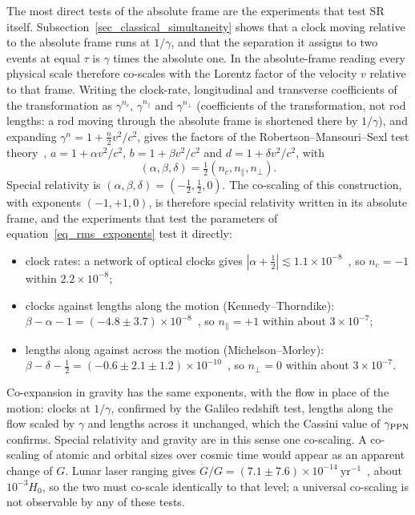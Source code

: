 \documentclass{iopjournal}
\begin{document}
The most direct tests of the absolute frame are the experiments that test SR itself. 
Subsection~\ref{sec_classical_simultaneity} shows that a clock moving relative to the absolute frame runs at $1/\gamma$, and that the separation it assigns to two events at equal $\tau$ is $\gamma$ times the absolute one. In the absolute-frame reading every physical scale therefore co-scales with the Lorentz factor of the velocity $v$ relative to that frame. Writing the clock-rate, longitudinal and transverse coefficients of the transformation as $\gamma^{n_c}$, $\gamma^{n_\parallel}$ and $\gamma^{n_\perp}$ (coefficients of the transformation, not rod lengths: a rod moving through the absolute frame is shortened there by $1/\gamma$), and expanding $\gamma^n=1+\tfrac{n}{2}v^2/c^2$, gives the factors of the Robertson--Mansouri--Sexl test theory~\cite{MansouriSexl1977}, $a=1+\alpha v^2/c^2$, $b=1+\beta v^2/c^2$ and $d=1+\delta v^2/c^2$, with
\begin{equation}\label{eq_rms_exponents}
    \left(\alpha,\beta,\delta\right)=\tfrac12\left(n_c,n_\parallel,n_\perp\right).
\end{equation}
Special relativity is $(\alpha,\beta,\delta)=(-\tfrac12,\tfrac12,0)$. The co-scaling of this construction, with exponents $(-1,+1,0)$, is therefore special relativity written in its absolute frame, and the experiments that test the parameters of equation~\eqref{eq_rms_exponents} test it directly:
\begin{itemize}
\item clock rates: a network of optical clocks gives $|\alpha+\tfrac12|\lesssim1.1\times10^{-8}$~\cite{Delva2017}, so $n_c=-1$ within $2.2\times10^{-8}$;
\item clocks against lengths along the motion (Kennedy--Thorndike): $\beta-\alpha-1=(-4.8\pm3.7)\times10^{-8}$~\cite{Tobar2010}, so $n_\parallel=+1$ within about $3\times10^{-7}$;
\item lengths along against across the motion (Michelson--Morley): $\beta-\delta-\tfrac12=(-0.6\pm2.1\pm1.2)\times10^{-10}$~\cite{Antonini2005,Schiller2006}, so $n_\perp=0$ within about $3\times10^{-7}$.
\end{itemize}
Co-expansion in gravity has the same exponents, with the flow in place of the motion: clocks at $1/\gamma$, confirmed by the Galileo redshift test, lengths along the flow scaled by $\gamma$ and lengths across it unchanged, which the Cassini value of $\gamma_{\rm PPN}$ confirms. Special relativity and gravity are in this sense one co-scaling. A co-scaling of atomic and orbital sizes over cosmic time would appear as an apparent change of $G$. Lunar laser ranging gives $\dot G/G=(7.1\pm7.6)\times10^{-14}~\mathrm{yr^{-1}}$~\cite{HofmannMuller2018}, about $10^{-3}H_0$, so the two must co-scale identically to that level; a universal co-scaling is not observable by any of these tests.
\end{document}
